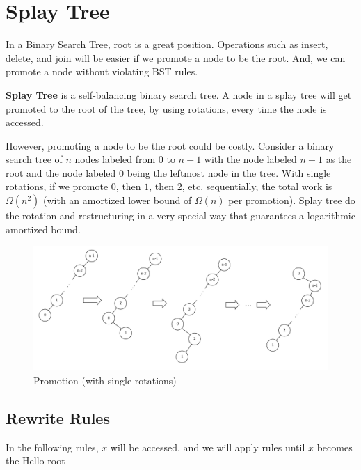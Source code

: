 \documentclass[12pt]{article}
\begin{document}
\MakeScribeTop


\section{Splay Tree}

In a Binary Search Tree, root is a great position. Operations such as insert, delete, and join will be easier if
we promote a node to be the root. And, we can promote a node without violating BST rules. 

\textbf{Splay Tree} is a self-balancing binary search tree. A node in a splay tree will get promoted to the root of the tree, by using rotations, every time the
node is accessed.

However, promoting a node to be the root could be costly. Consider a binary search tree of $n$ nodes labeled from $0$ to $n-1$ with the node labeled $n-1$ as
the root and the node labeled $0$ being the leftmost node in the tree. With single rotations, if we
promote $0$, then $1$, then $2$, etc. sequentially, the total work is $\Omega(n^2)$ (with an amortized lower bound of $\Omega(n)$
per promotion). Splay tree do the rotation and restructuring in a very special way that guarantees
a logarithmic amortized bound.

\begin{figure}[h]
  \centering
  \includegraphics[scale=0.5]{promotion.png}
  \caption{Promotion (with single rotations)}
\end{figure}


\subsection{Rewrite Rules}
In the following rules, $x$ will be accessed, and we will apply rules until $x$ becomes the
Hello
root
\end{document}
